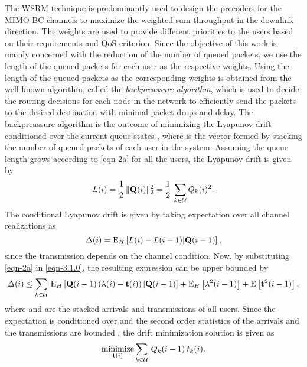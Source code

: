 
The \ac{WSRM} technique is predominantly used to design the precoders for the \ac{MIMO} \ac{BC} channels to maximize the weighted sum throughput in the downlink direction. The weights are used to provide different priorities to the users based on their requirements and \ac{QoS} criterion. Since the objective of this work is mainly concerned with the reduction of the number of queued packets, we use the length of the queued packets for each user as the respective weights. Using the length of the queued packets as the corresponding weights is obtained from the well known algorithm, called the \textit{backpreassure algorithm}, which is used to decide the routing decisions for each node in the network to efficiently send the packets to the desired destination with minimal packet drops and delay. The backpreassure algorithm is the outcome of minimizing the Lyapunov drift conditioned over the current queue states , where  is the vector formed by stacking the number of queued packets of each user in the system. Assuming the queue length grows according to \eqref{eqn-2a} for all the users, the Lyapunov drift is given by \cite{georgiadis2006resource,neely2010stochastic}
\begin{equation}
L(i) = \frac{1}{2} \, \| \mathbf{Q}(i) \|^2_2 = \frac{1}{2} \, \sum_{k \in \mathcal{U}} Q_k(i)^2.
\end{equation}
The conditional Lyapunov drift is given by taking expectation over all channel realizations as
\begin{equation}
\Delta(i) = \mathrm{E}_H \left [ L(i) - L(i - 1) | \mbf{Q}(i - 1) \right ],
\label{eqn-3.1.0}
\end{equation}
since the transmission depends on the channel condition. Now, by substituting \eqref{eqn-2a} in \eqref{eqn-3.1.0}, the resulting expression can be upper bounded by
\begin{equation}
\Delta(i)\leq \sum_{k \in \mathcal{U}} \, \mathrm{E}_H \left [ \mathbf{Q}(i-1) \left ( \mathbf{\lambda}(i) - \mathbf{t}(i) \right ) | \mathbf{Q}(i-1) \right ] + \mathrm{E}_H \left [ \mathbf{\lambda}^2(i-1) \right ] + \mathrm{E} \left [ \mathbf{t}^2(i-1) \right ],
\end{equation}
where \me{\mbf{\lambda}} and  are the stacked arrivals and transmissions of all users. Since the expectation is conditioned over  and the second order statistics of the arrivals and the transmissions are bounded \cite{neely2010stochastic}, the drift minimization solution is given as
\begin{equation}
\underset{\mbf{t}(i)}{\text{minimize}} \sum_{k \in \mc{U}} \, Q_k(i-1) \: t_k(i).
\label{backpreassure}
\end{equation}

